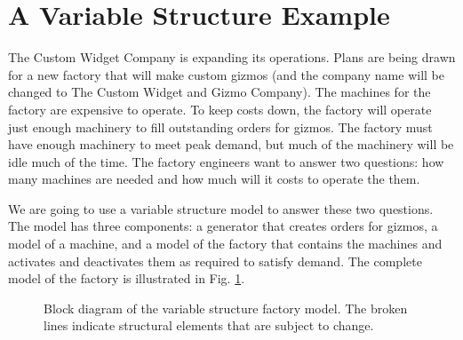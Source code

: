 \section{A Variable Structure Example}
The Custom Widget Company is expanding its operations. Plans are being drawn for a new factory that will make custom gizmos (and the company name will be changed to The Custom Widget and Gizmo Company). The machines for the factory are expensive to operate. To keep costs down, the factory will operate just enough machinery to fill outstanding orders for gizmos. The factory must have enough machinery to meet peak demand, but much of the machinery will be idle much of the time. The factory engineers want to answer two questions: how many machines are needed and how much will it costs to operate the them.

We are going to use a variable structure model to answer these two questions. The model has three components: a generator that creates orders for gizmos, a model of a machine, and a model of the factory that contains the machines and activates and deactivates them as required to satisfy demand. The complete model of the factory is illustrated in Fig. \ref{fig:factory_model}.
\begin{figure}[ht]
\centering
{}
\caption{Block diagram of the variable structure factory model. The broken lines indicate structural elements that are subject to change.}
\label{fig:factory_model}
\end{figure}

